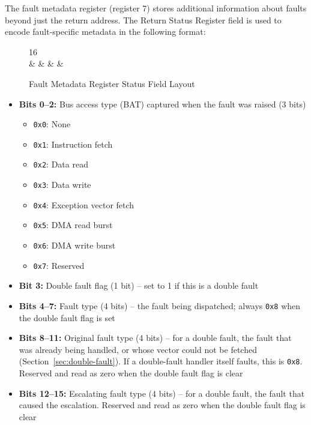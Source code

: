 The fault metadata register (register 7) stores additional information about faults beyond just the return address. The
Return Status Register field is used to encode fault-specific metadata in the following format:

\begin{figure}[H]
	\centering
	\begin{bytefield}[bitwidth=1.5em]{16}
		 \\
		 &  &  &  &
	\end{bytefield}
	\caption{Fault Metadata Register Status Field Layout}
	\label{fig:fault-metadata-register-layout}
\end{figure}

\begin{itemize}
	\item \textbf{Bits 0--2:} Bus access type (BAT) captured when the fault was raised (3 bits)
	      \begin{itemize}
		      \item \texttt{0x0}: None
		      \item \texttt{0x1}: Instruction fetch
		      \item \texttt{0x2}: Data read
		      \item \texttt{0x3}: Data write
		      \item \texttt{0x4}: Exception vector fetch
		      \item \texttt{0x5}: DMA read burst
		      \item \texttt{0x6}: DMA write burst
		      \item \texttt{0x7}: Reserved
	      \end{itemize}
	\item \textbf{Bit 3:} Double fault flag (1 bit) -- set to 1 if this is a double fault
	\item \textbf{Bits 4--7:} Fault type (4 bits) -- the fault being dispatched; always \texttt{0x8} when the double fault
	      flag is set
	\item \textbf{Bits 8--11:} Original fault type (4 bits) -- for a double fault, the fault that was already being
	      handled, or whose vector could not be fetched (Section~\ref{sec:double-fault}). If a double-fault handler itself
	      faults, this is \texttt{0x8}. Reserved and read as zero when the double fault flag is clear
	\item \textbf{Bits 12--15:} Escalating fault type (4 bits) -- for a double fault, the fault that caused the escalation.
	      Reserved and read as zero when the double fault flag is clear
\end{itemize}

